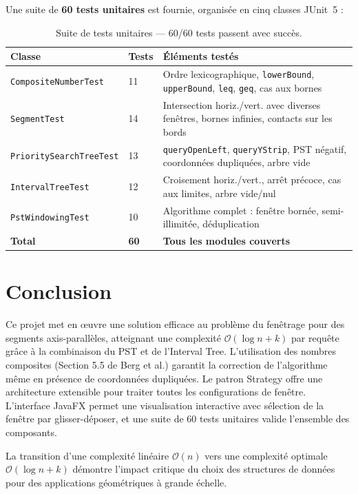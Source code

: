 \documentclass[11pt,a4paper]{article}
\begin{document}
Une suite de \textbf{60 tests unitaires} est fournie, organisée en cinq classes JUnit~5 :

\begin{table}[h]
\centering
\begin{tabular}{@{}llp{7cm}@{}}
\toprule
\textbf{Classe} & \textbf{Tests} & \textbf{Éléments testés} \\
\midrule
\texttt{CompositeNumberTest} & 11 & Ordre lexicographique, \texttt{lowerBound}, \texttt{upperBound}, \texttt{leq}, \texttt{geq}, cas aux bornes \\
\texttt{SegmentTest} & 14 & Intersection horiz./vert. avec diverses fenêtres, bornes infinies, contacts sur les bords \\
\texttt{PrioritySearchTreeTest} & 13 & \texttt{queryOpenLeft}, \texttt{queryYStrip}, PST négatif, coordonnées dupliquées, arbre vide \\
\texttt{IntervalTreeTest} & 12 & Croisement horiz./vert., arrêt précoce, cas aux limites, arbre vide/nul \\
\texttt{PstWindowingTest} & 10 & Algorithme complet : fenêtre bornée, semi-illimitée, déduplication \\
\midrule
\textbf{Total} & \textbf{60} & \textbf{Tous les modules couverts} \\
\bottomrule
\end{tabular}
\caption{Suite de tests unitaires — 60/60 tests passent avec succès.}
\end{table}

\section{Conclusion}

Ce projet met en œuvre une solution efficace au problème du fenêtrage pour des segments axis-parallèles, atteignant une complexité $\mathcal{O}(\log n + k)$ par requête grâce à la combinaison du PST et de l'Interval Tree. L'utilisation des nombres composites (Section 5.5 de Berg et al.) garantit la correction de l'algorithme même en présence de coordonnées dupliquées. Le patron Strategy offre une architecture extensible pour traiter toutes les configurations de fenêtre. L'interface JavaFX permet une visualisation interactive avec sélection de la fenêtre par glisser-déposer, et une suite de 60 tests unitaires valide l'ensemble des composants.

La transition d'une complexité linéaire $\mathcal{O}(n)$ vers une complexité optimale $\mathcal{O}(\log n + k)$ démontre l'impact critique du choix des structures de données pour des applications géométriques à grande échelle.
\end{document}
